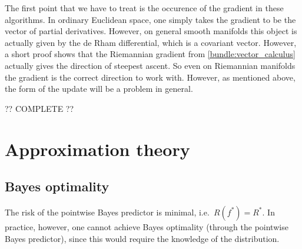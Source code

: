     The first point that we have to treat is the occurence of the gradient in these algorithms. In ordinary Euclidean space, one simply takes the gradient to be the vector of partial derivatives. However, on general smooth manifolds this object is actually given by the de Rham differential, which is a covariant vector. However, a short proof shows that the Riemannian gradient from \cref{bundle:vector_calculus} actually gives the direction of steepest ascent. So even on Riemannian manifolds the gradient is the correct direction to work with. However, as mentioned above, the form of the update will be a problem in general.

    ?? COMPLETE ??

\section{Approximation theory}
\subsection{Bayes optimality}


    \begin{property}
        The risk of the pointwise Bayes predictor is minimal, i.e.~$R(f^*)=R^*$. In practice, however, one cannot achieve Bayes optimality (through the pointwise Bayes predictor), since this would require the knowledge of the distribution.
    \end{property}

